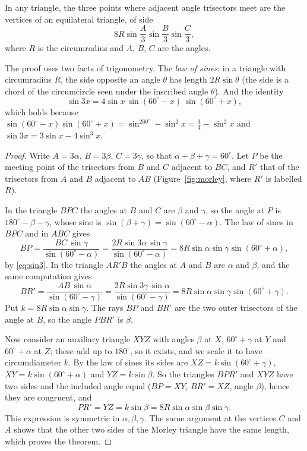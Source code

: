 \begin{theorem}[Morley, 1899]\label{thm:morley}
In any triangle, the three points where adjacent angle trisectors meet are the vertices of an equilateral triangle, of side
\[
8R\sin\frac A3\sin\frac B3\sin\frac C3 ,
\]
where $R$ is the circumradius and $A$, $B$, $C$ are the angles.
\end{theorem}

The proof uses two facts of trigonometry. The \emph{law of sines}: in a triangle with circumradius $R$, the side opposite an angle
$\theta$ has length $2R\sin\theta$ (the side is a chord of the circumcircle seen under the inscribed angle $\theta$). And the identity
\begin{equation}\label{eq:sin3}
\sin3x=4\sin x\,\sin(60^\circ-x)\,\sin(60^\circ+x),
\end{equation}
which holds because $\sin(60^\circ-x)\sin(60^\circ+x)=\sin^260^\circ-\sin^2x=\frac34-\sin^2x$ and $\sin3x=3\sin x-4\sin^3x$.

\begin{proof}
Write $A=3\alpha$, $B=3\beta$, $C=3\gamma$, so that $\alpha+\beta+\gamma=60^\circ$. Let $P$ be the meeting point of the trisectors from $B$ and
$C$ adjacent to $BC$, and $R'$ that of the trisectors from $A$ and $B$ adjacent to $AB$ (Figure~\ref{fig:morley}, where $R'$ is labelled
$R$).

In the triangle $BPC$ the angles at $B$ and $C$ are $\beta$ and $\gamma$, so the angle at $P$ is $180^\circ-\beta-\gamma$, whose sine is
$\sin(\beta+\gamma)=\sin(60^\circ-\alpha)$. The law of sines in $BPC$ and in $ABC$ gives
\[
BP=\frac{BC\,\sin\gamma}{\sin(60^\circ-\alpha)}=\frac{2R\sin3\alpha\,\sin\gamma}{\sin(60^\circ-\alpha)}=8R\sin\alpha\sin\gamma\sin(60^\circ+\alpha),
\]
by \eqref{eq:sin3}. In the triangle $AR'B$ the angles at $A$ and $B$ are $\alpha$ and $\beta$, and the same computation gives
\[
BR'=\frac{AB\,\sin\alpha}{\sin(60^\circ-\gamma)}=\frac{2R\sin3\gamma\,\sin\alpha}{\sin(60^\circ-\gamma)}=8R\sin\alpha\sin\gamma\sin(60^\circ+\gamma).
\]
Put $k=8R\sin\alpha\sin\gamma$. The rays $BP$ and $BR'$ are the two outer trisectors of the angle at $B$, so the angle $PBR'$ is $\beta$.

Now consider an auxiliary triangle $XYZ$ with angles $\beta$ at $X$, $60^\circ+\gamma$ at $Y$ and $60^\circ+\alpha$ at $Z$; these add up
to $180^\circ$, so it exists, and we scale it to have circumdiameter $k$. By the law of sines its sides are $XZ=k\sin(60^\circ+\gamma)$,
$XY=k\sin(60^\circ+\alpha)$ and $YZ=k\sin\beta$. So the triangles $BPR'$ and $XYZ$ have two sides and the included angle equal
($BP=XY$, $BR'=XZ$, angle $\beta$), hence they are congruent, and
\[
PR'=YZ=k\sin\beta=8R\sin\alpha\sin\beta\sin\gamma .
\]
This expression is symmetric in $\alpha,\beta,\gamma$. The same argument at the vertices $C$ and $A$ shows that the other two sides of the
Morley triangle have the same length, which proves the theorem.
\end{proof}

